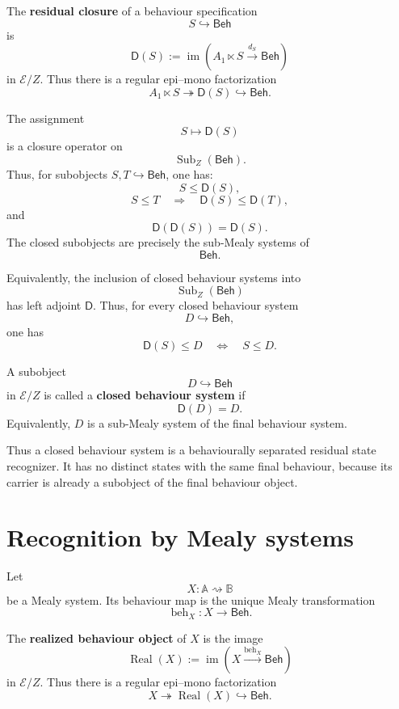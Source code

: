 \begin{definition}
\label{def:state-eilenberg-residual-closure}
The \textbf{residual closure} of a behaviour specification
\[
S\hookrightarrow\mathsf{Beh}
\]
is
\[
\mathsf D(S)
:=
\operatorname{im}
\left(
A_1\ltimes S
\xrightarrow{d_S}
\mathsf{Beh}
\right)
\]
in \(\mathcal E/Z\). Thus there is a regular epi--mono factorization
\[
A_1\ltimes S
\twoheadrightarrow
\mathsf D(S)
\hookrightarrow
\mathsf{Beh}.
\]
\end{definition}

The assignment
\[
S\longmapsto\mathsf D(S)
\]
is a closure operator on
\[
\operatorname{Sub}_Z(\mathsf{Beh}).
\]
Thus, for subobjects \(S,T\hookrightarrow\mathsf{Beh}\), one has:
\[
S\leq \mathsf D(S),
\]
\[
S\leq T
\quad\Longrightarrow\quad
\mathsf D(S)\leq \mathsf D(T),
\]
and
\[
\mathsf D(\mathsf D(S))=\mathsf D(S).
\]
The closed subobjects are precisely the sub-Mealy systems of
\[
\mathsf{Beh}.
\]

Equivalently, the inclusion of closed behaviour systems into
\[
\operatorname{Sub}_Z(\mathsf{Beh})
\]
has left adjoint \(\mathsf D\). Thus, for every closed behaviour system
\[
D\hookrightarrow\mathsf{Beh},
\]
one has
\[
\mathsf D(S)\leq D
\quad\Longleftrightarrow\quad
S\leq D.
\]

\begin{definition}
\label{def:state-eilenberg-closed-behaviour-system}
A subobject
\[
D\hookrightarrow \mathsf{Beh}
\]
in \(\mathcal E/Z\) is called a \textbf{closed behaviour system} if
\[
\mathsf D(D)=D.
\]
Equivalently, \(D\) is a sub-Mealy system of the final behaviour system.
\end{definition}

Thus a closed behaviour system is a behaviourally separated residual state
recognizer. It has no distinct states with the same final behaviour, because
its carrier is already a subobject of the final behaviour object.

\section{Recognition by Mealy systems}
\label{sec:state-eilenberg-recognition-by-mealy-systems}

Let
\[
X:\mathbb A\rightsquigarrow\mathbb B
\]
be a Mealy system. Its behaviour map is the unique Mealy transformation
\[
\operatorname{beh}_X:X\to\mathsf{Beh}.
\]

\begin{definition}
\label{def:state-eilenberg-realized-behaviour-object}
The \textbf{realized behaviour object} of \(X\) is the image
\[
\operatorname{Real}(X)
:=
\operatorname{im}
\left(
X\xrightarrow{\operatorname{beh}_X}\mathsf{Beh}
\right)
\]
in \(\mathcal E/Z\). Thus there is a regular epi--mono factorization
\[
X\twoheadrightarrow
\operatorname{Real}(X)
\hookrightarrow
\mathsf{Beh}.
\]
\end{definition}

